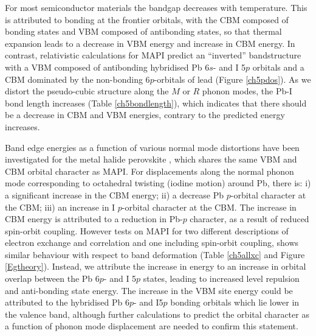 For most semiconductor materials the bandgap decreases with temperature. This is attributed to bonding at the frontier orbitals, with the CBM composed of bonding states and VBM composed of antibonding states, so that thermal expansion leads to a decrease in VBM energy and increase in CBM energy.\autocite{Francisco2019}
In contrast, relativistic calculations for MAPI predict an ``inverted'' bandstructure with a VBM composed of antibonding hybridised Pb 6$s$- and I 5$p$ orbitals and a CBM dominated by the non-bonding 6$p$-orbitals of lead (Figure \ref{ch5pdos}).\autocite{Brivio2013}
As we distort the pseudo-cubic structure along the $M$ or $R$ phonon modes, the Pb-I bond length increases (Table \ref{ch5bondlength}), which indicates that there should be a decrease in CBM and VBM energies, contrary to the predicted energy increases.

Band edge energies as a function of various normal mode distortions have been investigated for the metal halide perovskite , which shares the same VBM and CBM orbital character as MAPI.\autocite{McKechnie2018} For displacements along the normal phonon mode corresponding to octahedral twisting (iodine motion) around Pb, there is: i) a significant increase in the CBM energy; ii) a decrease Pb $p$-orbital character at the CBM; iii) an increase in I $p$-orbital character at the CBM. The increase in CBM energy is attributed to a reduction in Pb-$p$ character, as a result of reduced spin-orbit coupling. However tests on MAPI for two different descriptions of electron exchange and correlation and one including spin-orbit coupling, shows similar behaviour with respect to band deformation (Table \ref{ch5allxc} and Figure \ref{Egtheory}). 
Instead, we attribute the increase in energy to an increase in orbital overlap between the Pb 6$p$- and I 5$p$ states, leading to increased level repulsion and anti-bonding state energy.
The increase in the VBM site energy could be attributed to the hybridised Pb 6$p$- and I5$p$ bonding orbitals which lie lower in the valence band,\autocite{Wang2015i} although further calculations to predict the orbital character as a function of phonon mode displacement are needed to confirm this statement.

